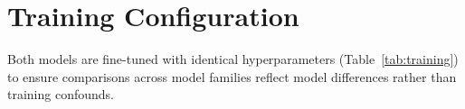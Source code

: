 \begin{table}[t]
\centering
\small
\caption{Multi-seed quality estimation on SciERC ($N{=}8$, $T{=}1.0$; Qwen: 5 seeds (42, 123, 456, 2024, 3141); LLaMA: 3 seeds (42, 123, 456)). NER: both models; RE: Qwen only (preliminary). Signal ranking is stable across seeds ($\sigma{\leq}0.025$). $\sigma$ is population standard deviation over seeds.}
\label{tab:multiseed}
\end{table}

\section{Training Configuration}\label{app:training}

Both models are fine-tuned with identical hyperparameters (Table~\ref{tab:training}) to ensure comparisons across model families reflect model differences rather than training confounds.

